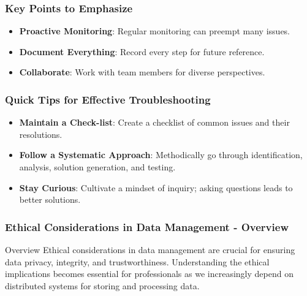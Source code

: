 \documentclass[aspectratio=169]{beamer}
\begin{document}
\begin{frame}[fragile]
  \frametitle{Key Points to Emphasize}
  \begin{itemize}
    \item \textbf{Proactive Monitoring}: Regular monitoring can preempt many issues.
    \item \textbf{Document Everything}: Record every step for future reference.
    \item \textbf{Collaborate}: Work with team members for diverse perspectives.
  \end{itemize}
\end{frame}

\begin{frame}[fragile]
  \frametitle{Quick Tips for Effective Troubleshooting}
  \begin{itemize}
    \item \textbf{Maintain a Check-list}: Create a checklist of common issues and their resolutions.
    \item \textbf{Follow a Systematic Approach}: Methodically go through identification, analysis, solution generation, and testing.
    \item \textbf{Stay Curious}: Cultivate a mindset of inquiry; asking questions leads to better solutions.
  \end{itemize}
\end{frame}

\begin{frame}[fragile]
    \frametitle{Ethical Considerations in Data Management - Overview}
    \begin{block}{Overview}
        Ethical considerations in data management are crucial for ensuring data privacy, integrity, and trustworthiness. Understanding the ethical implications becomes essential for professionals as we increasingly depend on distributed systems for storing and processing data.
    \end{block}
\end{frame}
\end{document}
